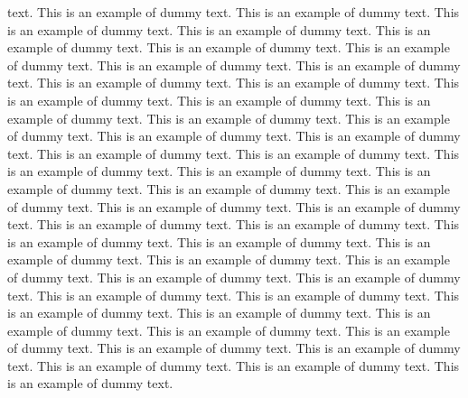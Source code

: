 \documentclass[lineno]{jfm}
\begin{document}
text. This is an example of dummy text. This is an example of dummy text. This is an example of dummy text. This is an example of dummy text. This is an example of dummy text. This is an example of dummy text. This is an example of dummy text. This is an example of dummy text. This is an example of dummy text. This is an example of dummy text. This is an example of dummy text. This is an example of dummy text. This is an example of dummy text. This is an example of dummy text. This is an example of dummy text. This is an example of dummy text. This is an example of dummy text. This is an example of dummy text. This is an example of dummy text. This is an example of dummy text. This is an example of dummy text. This is an example of dummy text. This is an example of dummy text. This is an example of dummy text. This is an example of dummy text. This is an example of dummy text. This is an example of dummy text. This is an example of dummy text. This is an example of dummy text. This is an example of dummy text. This is an example of dummy text. This is an example of dummy text. This is an example of dummy text. This is an example of dummy text. This is an example of dummy text. This is an example of dummy text. This is an example of dummy text. This is an example of dummy text. This is an example of dummy text. This is an example of dummy text. This is an example of dummy text. This is an example of dummy text. This is an example of dummy text. This is an example of dummy text. This is an example of dummy text. This is an example of dummy text. This is an example of dummy text. This is an example of dummy text. 

%
%


%
\end{document}
